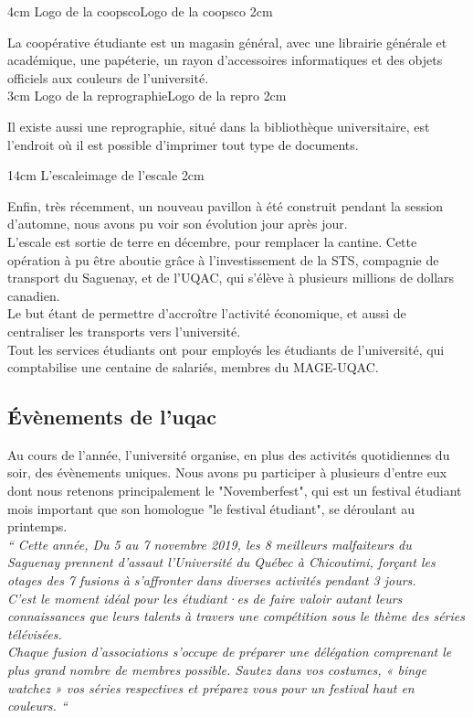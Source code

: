 {4cm}
{Logo de la coopsco}{Logo de la coopsco}
{2cm}

La coopérative étudiante est un magasin général, avec une librairie générale et académique, une papéterie, un rayon d'accessoires informatiques et des objets officiels aux couleurs de l'université.\\

{3cm}
{Logo de la reprographie}{Logo de la repro}
{2cm}

Il existe aussi une reprographie, situé dans la bibliothèque universitaire, est l'endroit où il est possible d'imprimer tout type de documents.

{14cm}
{L'escale}{image de l'escale}
{2cm}

Enfin, très récemment, un nouveau pavillon à été construit pendant la session d'automne, nous avons pu voir son évolution jour après jour.\\
L'escale est sortie de terre en décembre, pour remplacer la cantine. Cette opération à pu être aboutie grâce à l'investissement de la STS, compagnie de transport du Saguenay, et de l'UQAC, qui s'élève à plusieurs millions de dollars canadien.\\
Le but étant de permettre d'accroître l'activité économique, et aussi de centraliser les transports vers l'université.\\

Tout les services étudiants ont pour employés les étudiants de l'université, qui comptabilise une centaine de salariés, membres du MAGE-UQAC.\\

\subsection{Évènements de l'uqac}

Au cours de l'année, l'université organise, en plus des activités quotidiennes du soir, des évènements uniques. Nous avons pu participer à plusieurs d'entre eux dont nous retenons principalement le "Novemberfest", qui est un festival étudiant mois important que son homologue "le festival étudiant", se déroulant au printemps.\\

\textit{``
Cette année, Du 5 au 7 novembre 2019, les 8 meilleurs malfaiteurs du Saguenay prennent d’assaut l’Université du Québec à Chicoutimi, forçant les otages des 7 fusions à s’affronter dans diverses activités pendant 3 jours.\\
C’est le moment idéal pour les étudiant·es de faire valoir autant leurs connaissances que leurs talents à travers une compétition sous le
thème des séries télévisées.\\
Chaque fusion d’associations s’occupe de préparer une délégation comprenant le plus grand nombre de membres possible.
Sautez dans vos costumes, « binge watchez » vos séries respectives et préparez vous pour un festival haut en couleurs.
``}\\
\\

